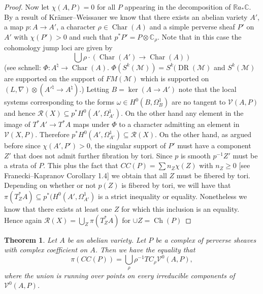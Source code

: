 \documentclass[11pt,reqno]{amsart}
\newtheorem{theorem}{Theorem}[section]
\theoremstyle{definition}
\theoremstyle{remark}
\theoremstyle{cited}
\theoremstyle{citeddef}
\DeclareMathOperator{\Char}{Char}
\newcommand{\sM}{\mathcal{M}}
\newcommand{\sR}{\mathcal{R}}
\newcommand\sV{{\mathcal V}}
\newcommand{\bbC}{\mathbb{C}}
\newcommand{\bbR}{\mathbb{R}}
\DeclareMathOperator{\DR}{DR}
\DeclareMathOperator{\Ch}{Ch}
\begin{document}
\begin{proof}
Now let $\chi(A, P) = 0$ for all $P$ appearing in the decomposition of $\bbR a_*\bbC$. By a result of Kr\"amer--Weissauer we know that there exists an abelian variety $A'$, a map $p\colon A\to A'$,
a character $\rho\in \Char(A)$ and a simple perverse sheaf $P'$ on
$A'$ with $\chi(P')>0$ and such that $p^*P'  = P\otimes \bbC_{\rho}$. Note that in this case the cohomology jump loci are given by
\[\bigcup \rho\cdot(\Char(A')\to \Char(A))\]
(see schnell: $\Phi : A^{\natural} \to \Char(A)$. $\Phi(S^k(\sM)) = S^k(\DR(\sM)$ and $S^k(\sM)$ are supported on the support of $FM(\sM)$ which 
is supported on $(L,\nabla)\otimes(A'^{\natural}\to A^{\natural})$.)
Letting $B = \ker(A\to A')$ note that the local systems corresponding to the forms $\omega\in H^0(B, \Omega_B^1)$ are no tangent to $\sV(A, P)$ and hence 
$\sR(X)\subseteq p^*H^0(A', \Omega_{A'}^1)$. On the other hand any element in the image of $T^*A' \to T^*A$
maps under $\Phi$ to a character admitting an element in $\sV(X, P)$. Therefore $p^*H^0(A', \Omega_{A'}^1)\subseteq \sR(X)$. 
On the other hand, as argued before since $\chi(A',P')>0$, the singular support of $P'$ must have a component $Z'$ that does not admit further fibration by tori.
Since $p$ is smooth $p^{-1}Z'$ must be a strata of $P$. This plus the fact that $CC(P) = \sum n_{Z}\chi(Z)$ with $n_Z\geq 0$ [see Franecki--Kapranov Corollary 1.4]
we obtain that all $Z$ must be fibered by tori. Depending on whether or not $p(Z)$ is fibered by tori, we will have that $\pi(T^*_ZA) \subseteq p^*(H^0(A',\Omega_{A'}^1)$ is a strict inequality or equality. Nonetheless we know that there exists at least one $Z$ for which this inclusion is an equality. Hence again
$\sR(X) = \bigcup_Z \pi(T^*_{Z}A)$ for $\cup Z = \Ch(P)$


\end{proof}



\begin{theorem}
Let $A$ be an abelian variety. Let $P$ be a complex of perverse sheaves with complex coefficient on $A$. 
Then we have the equality that
$$\pi(CC(P)) = \bigcup_{\rho} \rho^{-1} TC_{\rho} \sV^0(A,P), $$
where the union is running over points on every irreducible components of $\sV^0(A,P)$.  
\end{theorem}
\end{document}
